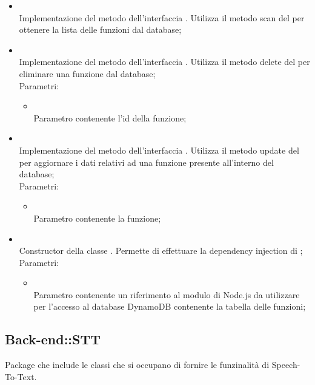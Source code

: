 \begin{itemize}
\begin{itemize}
		\item[]  \\
		Implementazione del metodo dell'interfaccia . Utilizza il metodo scan del  per ottenere la lista delle funzioni dal database;\\
		\item[]  \\
		Implementazione del metodo dell'interfaccia . Utilizza il metodo delete del  per eliminare una funzione dal database;\\
		Parametri:
		\begin{itemize}
			\item {} \\
			Parametro contenente l'id della funzione;
		\end{itemize}
		\item[]  \\
		Implementazione del metodo dell'interfaccia . Utilizza il metodo update del  per aggiornare i dati relativi ad una funzione presente all'interno del database;\\
		Parametri:
		\begin{itemize}
			\item {} \\
			Parametro contenente la funzione;
		\end{itemize}
		\item[]  \\
		Constructor della classe . Permette di effettuare la dependency injection di ;\\
		Parametri:
		\begin{itemize}
			\item {} \\
			Parametro contenente un riferimento al modulo di Node.js da utilizzare per l'accesso al database DynamoDB contenente la tabella delle funzioni;
		\end{itemize}
	\end{itemize}
\end{itemize}

\subsection{Back-end::STT}
Package che include le classi che si occupano di fornire le funzinalità di Speech-To-Text.
